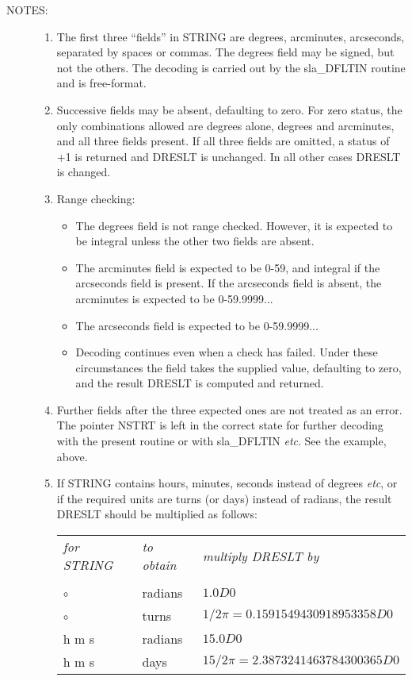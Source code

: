 \documentclass[11pt,twoside,nolof]{starlink}
\newlength{\oldspacing}
\newcommand{\notes}[1]
 {
   \begin{description}
     \item[NOTES:]
         #1
   \end{description}
}
\begin{document}
\setlength{\topsep}{\oldspacing}
\notes
{
 \begin{enumerate}
  \item The first three ``fields'' in STRING are degrees, arcminutes,
   arcseconds, separated by spaces or commas.  The degrees field
   may be signed, but not the others.  The decoding is carried
   out by the sla\_DFLTIN routine and is free-format.
  \item Successive fields may be absent, defaulting to zero.  For
   zero status, the only combinations allowed are degrees alone,
   degrees and arcminutes, and all three fields present.  If all
   three fields are omitted, a status of +1 is returned and DRESLT is
   unchanged.  In all other cases DRESLT is changed.
  \item Range checking:
   \begin{itemize}
    \item The degrees field is not range checked.  However, it is
     expected to be integral unless the other two fields are absent.
    \item The arcminutes field is expected to be 0-59, and integral if
     the arcseconds field is present.  If the arcseconds field
     is absent, the arcminutes is expected to be 0-59.9999...
    \item The arcseconds field is expected to be 0-59.9999...
    \item Decoding continues even when a check has failed.  Under these
     circumstances the field takes the supplied value, defaulting to
     zero, and the result DRESLT is computed and returned.
   \end{itemize}
   \item Further fields after the three expected ones are not treated as
    an error.  The pointer NSTRT is left in the correct state for
    further decoding with the present routine or with sla\_DFLTIN
    \textit{etc}.  See the example, above.
   \item If STRING contains hours, minutes, seconds instead of
    degrees \textit{etc},
    or if the required units are turns (or days) instead of radians,
    the result DRESLT should be multiplied as follows: \\ [1.5ex]
    \begin{tabular}{lll}
    \textit{for STRING} & \textit{to obtain} & \textit{multiply DRESLT by} \\ \\
    ${\circ}$~~\raisebox{-0.7ex}{$'$}~~\raisebox{-0.7ex}{$''$}
     & radians & $1.0D0$ \\
    ${\circ}$~~\raisebox{-0.7ex}{$'$}~~\raisebox{-0.7ex}{$''$}
     & turns & $1/{2 \pi} = 0.1591549430918953358D0$ \\
    h m s & radians & $15.0D0$ \\
    h m s & days & $15/{2\pi} = 2.3873241463784300365D0$
   \end{tabular}
 \end{enumerate}
}
\end{document}
